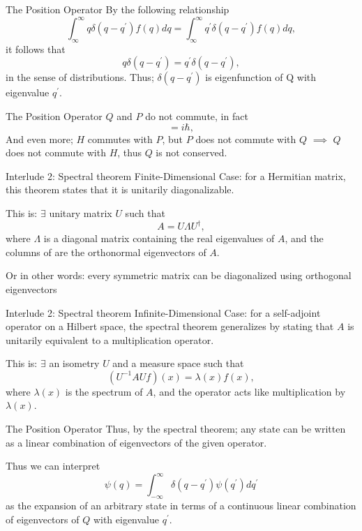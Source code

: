 \documentclass[12pt]{beamer}
\begin{document}
\begin{frame}{The Position Operator}
By the following relationship 
\begin{displaymath}
  \int_{\infty}^{\infty} q\delta(q-q^{\prime})f(q)dq = \int_{\infty}^{\infty} q^{\prime}\delta(q-q^{\prime})f(q)dq,
\end{displaymath}
it follows that 
\begin{displaymath}
  q\delta(q-q^{\prime}) = q^{\prime}\delta(q-q^{\prime}),
\end{displaymath}
in the sense of distributions. Thus; $\delta(q-q^{\prime})$ is eigenfunction of Q with eigenvalue $q^{\prime}$.
\end{frame}
\begin{frame}{The Position Operator}
$Q$ and $P$ do not commute, in fact 
\begin{displaymath}
  [Q,P]=i\hbar,
\end{displaymath}
And even more; $H$ commutes with $P$, but $P$ does not commute with $Q$ $\implies$ $Q$ does not commute with $H$, thus $Q$ is not conserved.
\end{frame}
\begin{frame}{Interlude 2: Spectral theorem}
Finite-Dimensional Case: for a Hermitian matrix, this theorem states that it is unitarily diagonalizable. 

This is:  $\exists$ unitary matrix $U$ such that 
\begin{displaymath}
  	A = U\Lambda U^{\dagger},
\end{displaymath}
where $\Lambda$  is a diagonal matrix containing the real eigenvalues of $A$, and the columns of  are the orthonormal eigenvectors of $A$.

Or in other words: every symmetric matrix can be diagonalized using orthogonal eigenvectors
\end{frame}
\begin{frame}{Interlude 2: Spectral theorem}
Infinite-Dimensional Case: for a self-adjoint operator  on a Hilbert space, the spectral theorem generalizes by stating that $A$ is unitarily equivalent to a multiplication operator.

This is: $\exists$ an isometry $U$ and a measure space such that 
\begin{displaymath}
  (U^{-1}AUf)(x)=\lambda(x)f(x),
\end{displaymath}
where $\lambda(x)$ is the spectrum of $A$, and the operator acts like multiplication by $\lambda(x)$.
\end{frame}
\begin{frame}{The Position Operator}
Thus, by the spectral theorem; any state can be written as a linear combination of eigenvectors of the given operator.

Thus we can interpret 
\begin{displaymath}
  \psi(q) = \int_{-\infty}^{\infty}\delta(q-q^{\prime})\psi(q^{\prime})dq^{\prime}
\end{displaymath}
as the expansion of an arbitrary state in terms of a continuous linear combination of eigenvectors of $Q$ with eigenvalue $q^{\prime}$.
\end{frame}
\end{document}

